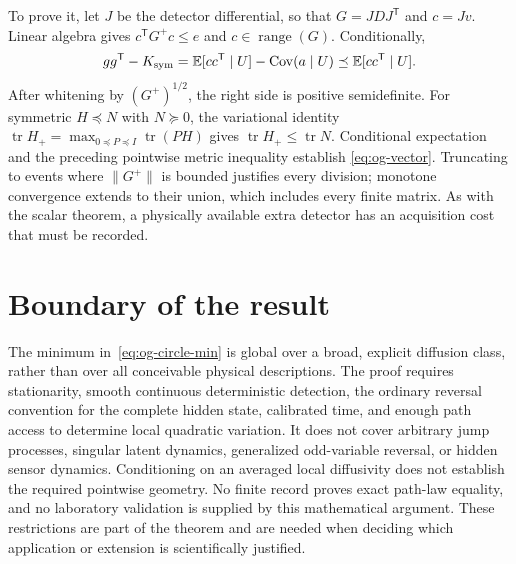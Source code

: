 To prove it, let $J$ be the detector differential, so that
$G=JDJ^{\mathsf T}$ and $c=Jv$. Linear algebra gives
$c^{\mathsf T}G^+c\leq e$ and $c\in\operatorname{range}(G)$.
Conditionally,
\[
 gg^{\mathsf T}-K_{\rm sym}
 =\mathbb E[cc^{\mathsf T}\mid U]
                -\operatorname{Cov}(a\mid U)
 \preceq\mathbb E[cc^{\mathsf T}\mid U].
\]
After whitening by $(G^+)^{1/2}$, the right side is positive semidefinite.
For symmetric $H\preceq N$ with $N\succeq0$, the variational identity
$\operatorname{tr}H_+=\max_{0\preceq P\preceq I}\operatorname{tr}(PH)$
gives $\operatorname{tr}H_+\leq\operatorname{tr}N$. Conditional expectation
and the preceding pointwise metric inequality establish
\eqref{eq:og-vector}. Truncating to events where $\|G^+\|$ is bounded
justifies every division; monotone convergence extends to their union,
which includes every finite matrix. As with the scalar theorem, a physically
available extra detector has an acquisition cost that must be recorded.

\section{Boundary of the result}

The minimum in~\eqref{eq:og-circle-min} is global over a broad, explicit
diffusion class, rather than over all conceivable physical descriptions.
The proof requires stationarity, smooth continuous deterministic detection,
the ordinary reversal convention for the complete hidden state, calibrated
time, and enough path access to determine local quadratic variation. It
does not cover arbitrary jump processes, singular latent dynamics,
generalized odd-variable reversal, or hidden sensor dynamics. Conditioning
on an averaged local diffusivity does not establish the required pointwise
geometry. No finite record proves exact path-law equality, and no laboratory
validation is supplied by this mathematical argument. These restrictions
are part of the theorem and are needed when deciding which application or
extension is scientifically justified.

